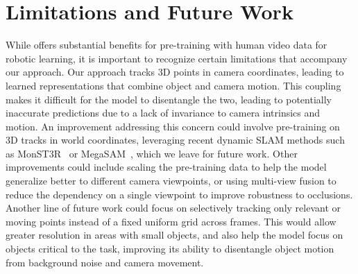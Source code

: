 \section{Limitations and Future Work} 
\label{sec:limitations}


While \smodel{} offers substantial benefits for pre-training with human video data for robotic learning, it is important to recognize certain limitations that accompany our approach. Our approach tracks 3D points in camera coordinates, leading to learned representations that combine object and camera motion. This coupling makes it difficult for the model to disentangle the two, leading to potentially inaccurate predictions due to a lack of invariance to camera intrinsics and motion. An improvement addressing this concern could involve pre-training on 3D tracks in world coordinates, leveraging recent dynamic SLAM methods such as MonST3R~\cite{zhang2024monst3r} or MegaSAM~\cite{li2024megasam}, which we leave for future work. Other improvements could include scaling the pre-training data to help the model generalize better to different camera viewpoints, or using multi-view fusion to reduce the dependency on a single viewpoint to improve robustness to occlusions. 
Another line of future work could focus on selectively tracking only relevant or moving points instead of a fixed uniform grid across frames. 
This would allow greater resolution in areas with small objects, and also help the model focus on objects critical to the task, improving its ability to disentangle object motion from background noise and camera movement.

